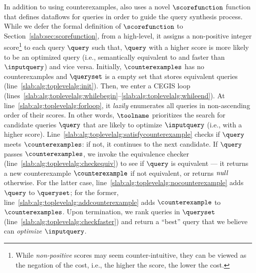 {In addition to using counterexamples, \toolname also uses a novel $\scorefunction$ function that defines dataflows for queries in order to guide the query synthesis process. 
While we defer the formal definition of $\scorefunction$ to Section~\ref{slab:sec:scorefunction}, from a high-level, it assigns a non-positive integer score\footnote{While \emph{non-positive} scores may seem counter-intuitive, they can be viewed as the negation of the cost, i.e., the higher the score, the lower the cost.} to each query $\query$ such that,  
$\query$ with a higher score is more likely to be an optimized query (i.e., semantically equivalent to and faster than $\inputquery$) and vice versa. 
Initially, $\counterexamples$ has no counterexamples and $\queryset$ is a empty set that stores equivalent queries (line~\ref{slab:alg:toplevelalg:init}). 
Then, we enter a CEGIS loop (lines~\ref{slab:alg:toplevelalg:whilebegin}--\ref{slab:alg:toplevelalg:whileend}). At line~\ref{slab:alg:toplevelalg:forloop}, it \emph{lazily} enumerates all queries in non-ascending order of their scores. In other words, $\toolname$ prioritizes the search for candidate queries $\query$ that are likely to optimize $\inputquery$ (i.e., with a higher score). 
Line~\ref{slab:alg:toplevelalg:satisfycounterexample} checks if $\query$ meets $\counterexamples$: if not, it continues to the next candidate. 
If $\query$ passes $\counterexamples$, we invoke the equivalence checker (line~\ref{slab:alg:toplevelalg:checkequiv}) to see if $\query$ is equivalent --- it returns a new counterexample $\counterexample$ if not equivalent, or returns $\emph{null}$ otherwise. 
For the latter case, line~\ref{slab:alg:toplevelalg:nocounterexample} adds $\query$ to $\queryset$; for the former, line~\ref{slab:alg:toplevelalg:addcounterexample} adds  $\counterexample$ to $\counterexamples$.
Upon termination, we rank queries in $\queryset$ (line~\ref{slab:alg:toplevelalg:checkfaster}) and return a ``best'' query that we believe can \emph{optimize} $\inputquery$.}



